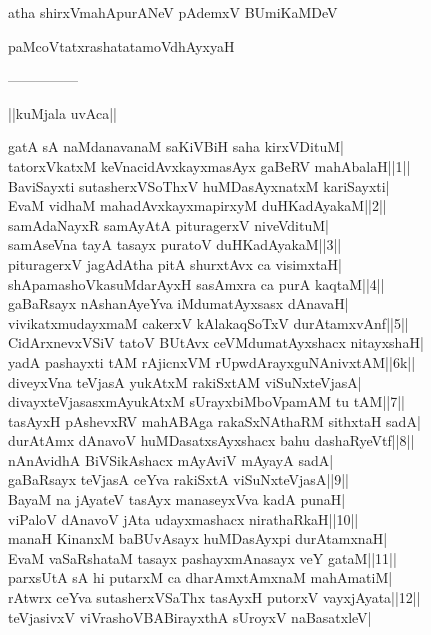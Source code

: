 \documentclass{article}
\begin{document}
\begin{center}
atha shirxVmahApurANeV pAdemxV BUmiKaMDeV
\end{center}

\begin{center}
paMcoVtatxrashatatamoVdhAyxyaH
\end{center}

\begin{center}
---------------
\end{center}

\begin{center}
||kuMjala uvAca||
\end{center}

gatA sA naMdanavanaM saKiVBiH saha kirxVDituM|\\
tatorxVkatxM keVnacidAvxkayxmasAyx gaBeRV mahAbalaH||1||\\
BaviSayxti sutasherxVSoThxV huMDasAyxnatxM kariSayxti|\\
EvaM vidhaM mahadAvxkayxmapirxyM duHKadAyakaM||2||\\
samAdaNayxR samAyAtA pituragerxV niveVdituM|\\
samAseVna tayA tasayx puratoV duHKadAyakaM||3||\\
pituragerxV jagAdAtha pitA shurxtAvx ca visimxtaH|\\
shApamashoVkasuMdarAyxH sasAmxra ca purA kaqtaM||4||\\
gaBaRsayx nAshanAyeYva iMdumatAyxsasx dAnavaH|\\
vivikatxmudayxmaM cakerxV kAlakaqSoTxV durAtamxvAnf||5||\\
CidArxnevxVSiV tatoV BUtAvx ceVMdumatAyxshacx nitayxshaH|\\
yadA pashayxti tAM rAjicnxVM rUpwdArayxguNAnivxtAM||6k||\\
diveyxVna teVjasA yukAtxM rakiSxtAM viSuNxteVjasA|\\
divayxteVjasasxmAyukAtxM sUrayxbiMboVpamAM tu tAM||7||\\
tasAyxH pAshevxRV mahABAga rakaSxNAthaRM sithxtaH sadA|\\
durAtAmx dAnavoV huMDasatxsAyxshacx bahu dashaRyeVtf||8||\\
nAnAvidhA BiVSikAshacx mAyAviV mAyayA sadA|\\
gaBaRsayx teVjasA ceYva rakiSxtA viSuNxteVjasA||9||\\
BayaM na jAyateV tasAyx manaseyxVva kadA punaH|\\
viPaloV dAnavoV jAta udayxmashacx nirathaRkaH||10||\\
manaH KinanxM baBUvAsayx huMDasAyxpi durAtamxnaH|\\
EvaM vaSaRshataM tasayx pashayxmAnasayx veY gataM||11||\\
parxsUtA sA hi putarxM ca dharAmxtAmxnaM mahAmatiM|\\
rAtwrx ceYva sutasherxVSaThx tasAyxH putorxV vayxjAyata||12||\\
teVjasivxV viVrashoVBABirayxthA sUroyxV naBasatxleV|\\
\end{document}
